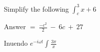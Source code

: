 Simplify the following \(\int_{c}^{3}{x + 6}\)

Answer \(= \ \frac{{- c}^{2}}{2}\  - \ 6c\  + \ 27\)

Inuendo \(e^{- i\omega t}\int_{}^{}\frac{3\pi}{x}\)
